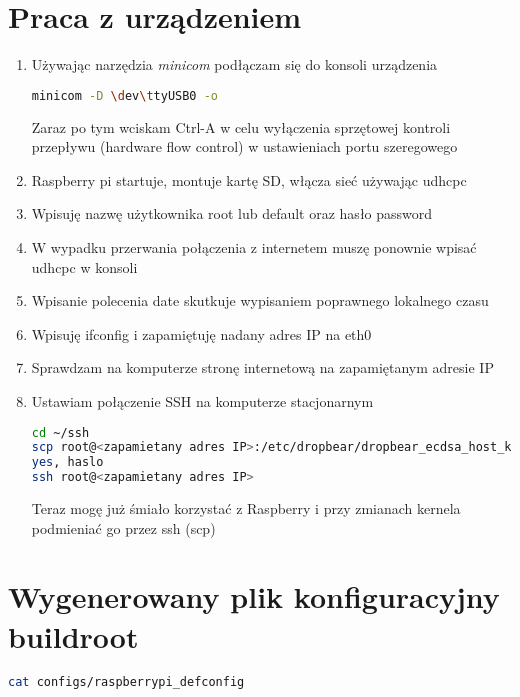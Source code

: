 \section{Praca z urządzeniem}
\begin{enumerate}
\item Używając narzędzia \emph{minicom} podłączam się do konsoli urządzenia
\begin{lstlisting}[language=bash]
minicom -D \dev\ttyUSB0 -o
\end{lstlisting}	
Zaraz po tym wciskam Ctrl-A w celu wyłączenia sprzętowej kontroli przepływu (hardware flow control) w ustawieniach portu szeregowego
\item Raspberry pi startuje, montuje kartę SD, włącza sieć używając udhcpc
\item Wpisuję nazwę użytkownika root lub default oraz hasło password
\item W wypadku przerwania połączenia z internetem muszę ponownie wpisać udhcpc w konsoli
\item Wpisanie polecenia date skutkuje wypisaniem poprawnego lokalnego czasu
\item Wpisuję ifconfig i zapamiętuję nadany adres IP na eth0
\item Sprawdzam na komputerze stronę internetową na zapamiętanym adresie IP
\item Ustawiam połączenie SSH na komputerze stacjonarnym
\begin{lstlisting}[language=bash]
cd ~/ssh
scp root@<zapamietany adres IP>:/etc/dropbear/dropbear_ecdsa_host_key ./
yes, haslo
ssh root@<zapamietany adres IP>
\end{lstlisting}
Teraz mogę już śmiało korzystać z Raspberry i przy zmianach kernela podmieniać go przez ssh (scp)
\end{enumerate}

\section{Wygenerowany plik konfiguracyjny buildroot}
\begin{lstlisting}[language=bash]
cat configs/raspberrypi_defconfig 

\end{lstlisting}	

